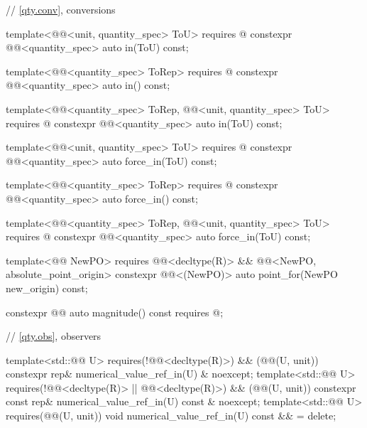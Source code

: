 \begin{codeblock}
{{  // \ref{qty.conv}, conversions

  template<@@<unit, quantity_spec> ToU>
    requires @\seebelownc@
  constexpr @@<quantity_spec> auto in(ToU) const;

  template<@@<quantity_spec> ToRep>
    requires @\seebelownc@
  constexpr @@<quantity_spec> auto in() const;

  template<@@<quantity_spec> ToRep,
           @@<unit, quantity_spec> ToU>
    requires @\seebelownc@
  constexpr @@<quantity_spec> auto in(ToU) const;

  template<@@<unit, quantity_spec> ToU>
    requires @\seebelownc@
  constexpr @@<quantity_spec> auto force_in(ToU) const;

  template<@@<quantity_spec> ToRep>
    requires @\seebelownc@
  constexpr @@<quantity_spec> auto force_in() const;

  template<@@<quantity_spec> ToRep,
           @@<unit, quantity_spec> ToU>
    requires @\seebelownc@
  constexpr @@<quantity_spec> auto force_in(ToU) const;

  template<@@ NewPO>
    requires @@<decltype(R)> &&
             @@<NewPO, absolute_point_origin>
  constexpr @@<(NewPO{})> auto point_for(NewPO new_origin) const;

  constexpr @@ auto magnitude() const
    requires @\seebelownc@;

  // \ref{qty.obs}, observers

  template<std::@@ U>
    requires(!@@<decltype(R)>) && (@@(U{}, unit))
  constexpr rep& numerical_value_ref_in(U) & noexcept;
  template<std::@@ U>
    requires(!@@<decltype(R)> ||
             @@<decltype(R)>) && (@@(U{}, unit))
  constexpr const rep& numerical_value_ref_in(U) const & noexcept;
  template<std::@@ U>
    requires(@@(U{}, unit))
  void numerical_value_ref_in(U) const && = delete;

}}
\end{codeblock}
